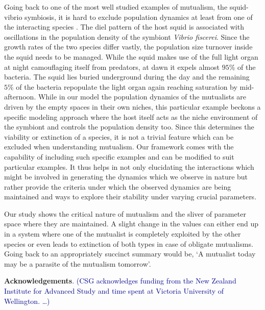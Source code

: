 \documentclass[12pt]{article}
\newcommand{\cha}[1]{\textcolor{darkblue}{(#1)}}
\begin{document}
Going back to one of the most well studied examples of mutualism, the squid-vibrio symbiosis, it is hard to exclude population dynamics at least from one of the interacting species \citep{nyholm:NRM:2004}.
The diel pattern of the host squid is associated with oscillations in the population density of the symbiont \textit{Vibrio fiscerei}.
Since the growth rates of the two species differ vastly, the population size turnover inside the squid needs to be managed.
While the squid makes use of the full light organ at night camouflaging itself from predators, at dawn it expels almost $95\%$ of the bacteria.
The squid lies buried underground during the day and the remaining $5\%$ of the bacteria repopulate the light organ again reaching saturation by mid-afternoon.
While in our model the population dynamics of the mutualists are driven by the empty spaces in their own niches, this particular example beckons a specific modeling approach where the host itself acts as the niche environment of the symbiont and controls the population density too.
Since this determines the viability or extinction of a species, it is not a trivial feature which can be excluded when understanding mutualism.
Our framework comes with the capability of including such specific examples and can be modified to suit particular examples.
It thus helps in not only elucidating the interactions which might be involved in generating the dynamics which we observe in nature but rather provide the criteria under which the observed dynamics are being maintained and ways to explore their stability under varying crucial parameters. 

Our study shows the critical nature of mutualism and the sliver of parameter space where they are maintained. 
A slight change in the values can either end up in a system where one of the mutualist is completely exploited by the other species or even leads to extinction of both types in case of obligate mutualisms.
Going back to \cite{janzen:bookchapter:1985} an appropriately succinct summary would be,
`A mutualist today may be a parasite of the mutualism tomorrow'.

\textbf{Acknowledgements}. \cha{CSG acknowledges funding from the New Zealand Institute for Advanced Study and time spent at Victoria University of Wellington. \ldots }



%






\renewcommand{\theequation}{A.\arabic{equation}}
\setcounter{equation}{0}
\end{document}
